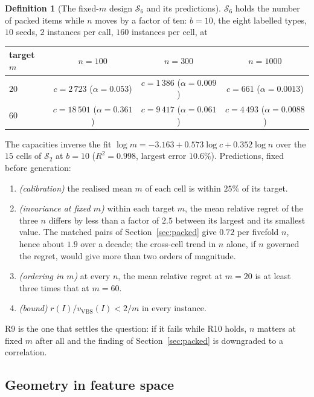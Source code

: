 \documentclass[a4paper,11pt]{article}
\theoremstyle{plain}
\theoremstyle{definition}
\newtheorem{definition}{Definition}
\theoremstyle{remark}
\begin{document}
\begin{definition}[The fixed-$m$ design $\mathcal S_6$ and its predictions]\label{def:prereg-m}
$\mathcal S_6$ holds the number of packed items while $n$ moves by a factor of ten:
$b=10$, the eight labelled types, $10$ seeds, $2$ instances per call, $160$ instances per
cell, at
\begin{center}\small
\begin{tabular}{@{}lccc@{}}
\toprule
target $m$ & $n=100$ & $n=300$ & $n=1000$ \\
\midrule
$20$ & $c=2\,723$ ($\alpha=0.053$) & $c=1\,386$ ($\alpha=0.009$) & $c=661$ ($\alpha=0.0013$) \\
$60$ & $c=18\,501$ ($\alpha=0.361$) & $c=9\,417$ ($\alpha=0.061$) & $c=4\,493$ ($\alpha=0.0088$) \\
\bottomrule
\end{tabular}
\end{center}
The capacities inverse the fit $\log m=-3.163+0.573\log c+0.352\log n$ over the $15$ cells of
$\mathcal S_2$ at $b=10$ ($R^{2}=0.998$, largest error $10.6\%$). Predictions, fixed before
generation:
\begin{enumerate}[label=\textbf{R\arabic*},leftmargin=2.6em,itemsep=2pt,start=8]
\item \emph{(calibration)} the realised mean $m$ of each cell is within $25\%$ of its target.
\item \emph{(invariance at fixed $m$)} within each target $m$, the mean relative regret of the
three $n$ differs by less than a factor of $2.5$ between its largest and its smallest value.
The matched pairs of Section~\ref{sec:packed} give $0.72$ per fivefold $n$, hence about $1.9$
over a decade; the cross-cell trend in $n$ alone, if $n$ governed the regret, would give more
than two orders of magnitude.
\item \emph{(ordering in $m$)} at every $n$, the mean relative regret at $m=20$ is at least
three times that at $m=60$.
\item \emph{(bound)} $r(I)/v_{\mathrm{VBS}}(I)<2/m$ in every instance.
\end{enumerate}
R9 is the one that settles the question: if it fails while R10 holds, $n$ matters at fixed
$m$ after all and the finding of Section~\ref{sec:packed} is downgraded to a correlation.
\end{definition}

\subsection{Geometry in feature space}\label{sec:pca}
\end{document}
